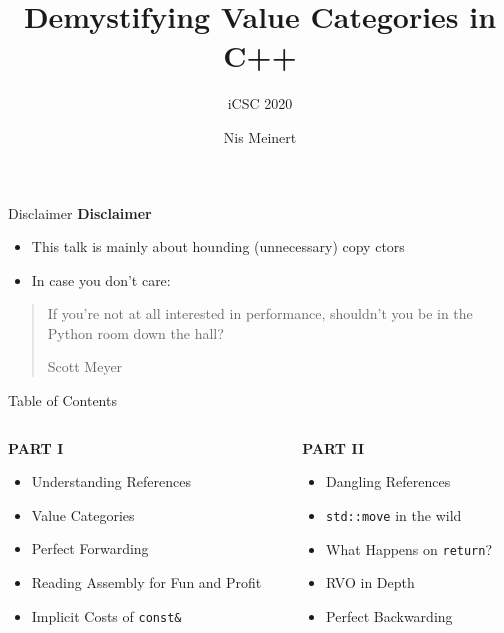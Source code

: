 \documentclass[compress,aspectratio=1610]{beamer}
\title{Demystifying Value Categories in C++}
\subtitle{iCSC 2020}
\institute{Rostock University}
\author{Nis Meinert}
\date{}
\begin{document}
\maketitle

\begin{frame}{Disclaimer}
    \textbf{Disclaimer} 
    \begin{itemize}
        \item This talk is mainly about hounding (unnecessary) copy ctors
        \item In case you don't care:
    \end{itemize}

    \blockquote[Scott Meyer]{If you’re not at all interested in performance, shouldn’t you be in the Python room down the hall?}
\end{frame}

\begin{frame}{Table of Contents}
    \begin{columns}[t]
        \begin{column}{.4\textwidth}
            \textbf{PART I}
            \begin{itemize}
                \item Understanding References
                \item Value Categories
                \item Perfect Forwarding
                \item Reading Assembly for Fun and Profit
                \item Implicit Costs of \texttt{const\&}
            \end{itemize}
        \end{column}
        \begin{column}{.4\textwidth}
            \textbf{PART II}
            \begin{itemize}
                \item Dangling References
                \item \texttt{std::move} in the wild
                \item What Happens on \texttt{return}?
                \item RVO in Depth
                \item Perfect Backwarding
            \end{itemize}
        \end{column}
    \end{columns}
\end{frame}

\end{document}
